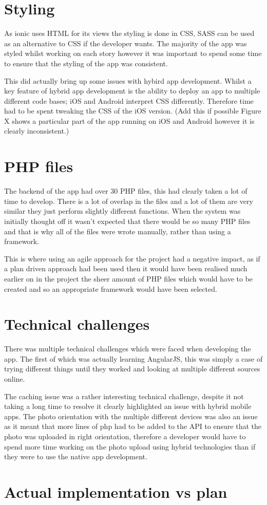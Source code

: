 \section{Styling}
As ionic uses HTML for its views the styling is done in CSS, SASS can be used as an alternative to CSS if the developer wants. The majority of the app was styled whilst working on each story however it was important to spend some time to ensure that the styling of the app was consistent.

This did actually bring up some issues with hybird app development. Whilst a key feature of hybrid app development is the ability to deploy an app to multiple different code bases; iOS and Android interpret CSS differently. Therefore time had to be spent tweaking the CSS of the iOS version. (Add this if possible Figure X shows a particular part of the app running on iOS and Android however it is clearly inconsistent.)


\section{PHP files}
The backend of the app had over 30 PHP files, this had clearly taken a lot of time to develop. There is a lot of overlap in the files and a lot of them are very similar they just perform slightly different functions. When the system was initially thought off it wasn't expected that there would be so many PHP files and that is why all of the files were wrote manually, rather than using a framework. 

This is where using an agile approach for the project had a negative impact, as if a plan driven approach had been used then it would have been realised much earlier on in the project the sheer amount of PHP files which would have to be created and so an appropriate framework would have been selected.

\section{Technical challenges}
There was multiple technical challenges which were faced when developing the app. The first of which was actually learning AngularJS, this was simply a case of trying different things until they worked and looking at multiple different sources online.

The caching issue was a rather interesting technical challenge, despite it not taking a long time to resolve it clearly highlighted an issue with hybrid mobile apps. The photo orientation with the multiple different devices was also an issue as it meant that more lines of php had to be added to the API to ensure that the photo was uploaded in right orientation, therefore a developer would have to spend more time working on the photo upload using hybrid technologies than if they were to use the native app development.            
\section{Actual implementation vs plan}
